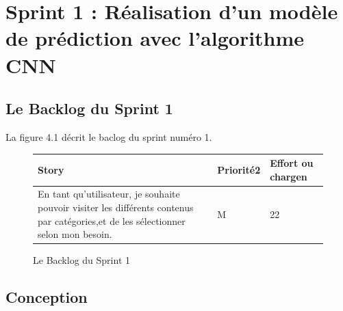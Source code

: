 \chapter{Sprint 1 : Réalisation d’un modèle de prédiction avec l’algorithme CNN}
\label{Chapitre 4} %


\section{Le Backlog du Sprint 1}
La figure 4.1 décrit le baclog du sprint numéro 1.
\begin{figure}[H]
\begin{tabular}{|p{7cm}|p{4cm}|p{4cm}|}
\hline
\textbf{Story} & \textbf{Priorité2 } & \textbf{Effort ou chargen} \\
\hline
En tant qu'utilisateur, je souhaite pouvoir visiter les différents contenus par catégories,et de les sélectionner selon mon besoin. & \begin{center}M\end{center} & \begin{center}22\end{center}\\
\hline
\end{tabular}
  \caption{Le Backlog du Sprint 1}
  \label{fig:Backlog1}
\end{figure}


\section{Conception}

